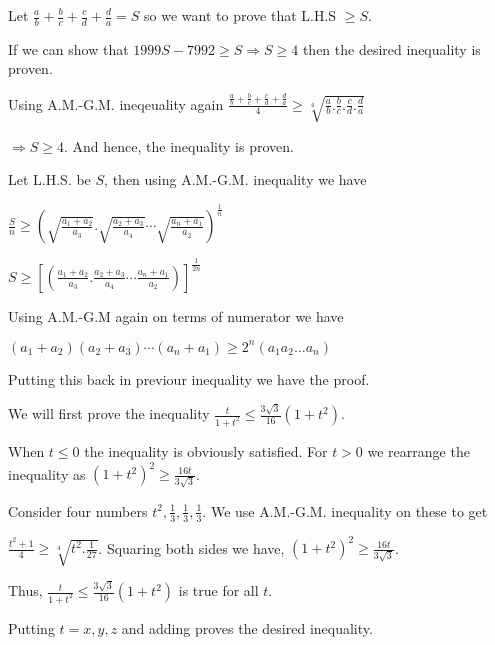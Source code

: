   Let $\frac{a}{b} + \frac{b}{c} + \frac{c}{d} + \frac{d}{a} = S$ so we want to prove that L.H.S $\geq S$.

  If we can show that $1999S - 7992\geq S\Rightarrow S\geq 4$ then the desired inequality is proven.

  Using A.M.-G.M. ineqeuality again $\frac{\frac{a}{b} + \frac{b}{c} + \frac{c}{d} + \frac{d}{a}}{4}\geq
  \sqrt[4]{\frac{a}{b} . \frac{b}{c} . \frac{c}{d} . \frac{d}{a}}$

  $\Rightarrow S\geq 4$. And hence, the inequality is proven.
\item Let L.H.S. be $S$, then using A.M.-G.M. inequality we have

  $\frac{S}{n}\geq \left(\sqrt{\frac{a_1 + a_2}{a_3}}.\sqrt{\frac{a_2 + a_3}{a_4}}\cdots\sqrt{\frac{a_n +
    a_1}{a_2}}\right)^{\frac{1}{n}}$

  $S\geq \left[\left(\frac{a_1 + a_2}{a_3}.\frac{a_2 + a_3}{a_4}\cdots \frac{a_n +
    a_1}{a_2}\right)\right]^{\frac{1}{2n}}$

  Using A.M.-G.M again on terms of numerator we have

  $(a_1 + a_2)(a_2 + a_3)\cdots(a_n + a_1)\geq 2^n(a_1a_2\ldots a_n)$

  Putting this back in previour inequality we have the proof.
\item We will first prove the inequality $\frac{t}{1 + t^2}\leq \frac{3\sqrt{3}}{16}(1 + t^2)$.

  When $t\leq 0$ the inequality is obviously satisfied. For $t > 0$ we rearrange the inequality as $(1 +
  t^2)^2\geq \frac{16t}{3\sqrt{3}}$.

  Consider four numbers $t^2, \frac{1}{3}, \frac{1}{3}, \frac{1}{3}$. We use A.M.-G.M. inequality on these
  to get

  $\frac{t^2 + 1}{4}\geq \sqrt[4]{t^2.\frac{1}{27}}$. Squaring both sides we have, $(1 + t^2)^2\geq
  \frac{16t}{3\sqrt{3}}$.

  Thus, $\frac{t}{1 + t^2}\leq \frac{3\sqrt{3}}{16}(1 + t^2)$ is true for all $t$.

  Putting $t = x, y, z$ and adding proves the desired inequality.
\item
\stopitemize
